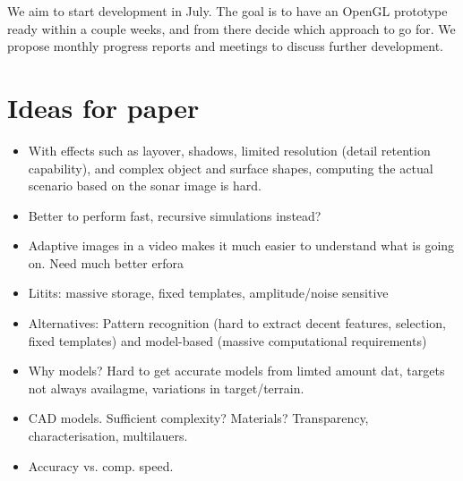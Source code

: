 \documentclass[
   article                                      %
 , 12pt                                         %
 , xelatex                                      %
 , bibtex                                       %
 , layout
]{common/mytemplate}
\begin{document}
We aim to start development in July. The goal is to have an OpenGL prototype ready within a couple weeks, and from there decide which approach to go for. We propose monthly progress reports and meetings to discuss further 
development.





\newpage

\section{Ideas for paper}

\begin{itemize}
\item With effects such as layover, shadows, limited resolution (detail retention capability), and complex object and surface shapes, computing the actual scenario based on the sonar image is hard.
\item Better to perform fast, recursive simulations instead?
\item Adaptive images in a video makes it much easier to understand what is going on. Need much better erfora
\item Litits: massive storage, fixed templates, amplitude/noise sensitive
\item Alternatives: Pattern recognition (hard to extract decent features, selection, fixed templates) and model-based (massive computational requirements)
\item Why models? Hard to get accurate models from limted amount dat, targets not always availagme, variations in target/terrain.
\item CAD models. Sufficient complexity? Materials? Transparency, characterisation, multilauers.
\item Accuracy vs. comp. speed.
\end{itemize}
\end{document}
